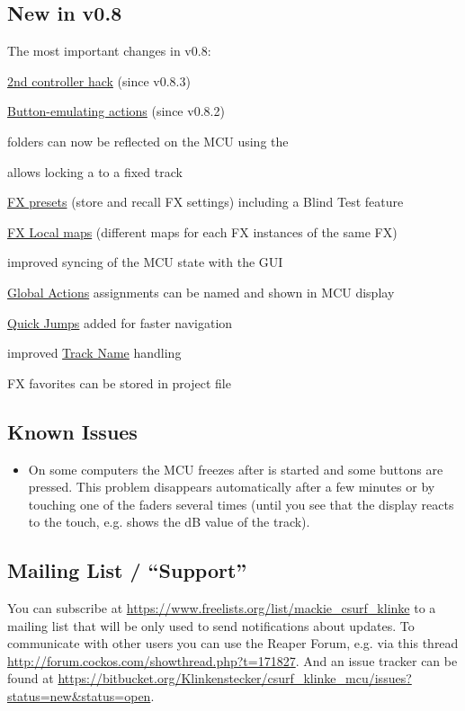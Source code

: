 \subsection{New in v0.8}

The most important changes in v0.8:
\begin{compactitem}
\item \hyperref[secondcontroller]{2nd controller hack} (since v0.8.3)
\item \hyperref[buttonactions]{Button-emulating actions} (since v0.8.2)
\item \reaper folders can now be reflected on the MCU using the \foldermode
\item \anchors allows locking a \cs to a fixed track
\item \hyperref[fxpresets]{FX presets} (store and recall FX settings) including
a Blind Test feature
\item \hyperref[localmaps]{FX Local maps} (different maps for each FX
instances of the same FX)
\item improved syncing of the MCU state with the \reaper GUI
\item \hyperref[globalactions]{Global Actions} assignments can be named and
shown in MCU display
\item \hyperref[quickjump]{Quick Jumps} added for faster navigation  
\item improved \hyperref[tracknames]{Track Name} handling
\item FX favorites can be stored in \reaper project file
\end{compactitem}

\subsection{Known Issues}
\begin{itemize}
\item On some computers the MCU freezes after  \reaper is started and
  some buttons are pressed. This problem disappears automatically after
  a few minutes or by touching one of the faders several times (until you
  see that the display reacts to the touch, e.g. shows the dB
  value of the track).
\end{itemize}

\subsection{Mailing List / ``Support''}
You can subscribe at \url{https://www.freelists.org/list/mackie_csurf_klinke}
to a mailing list that will be only used to send notifications about
updates.
To communicate with other users you can use the Reaper Forum,
e.g. via this thread
\url{http://forum.cockos.com/showthread.php?t=171827}.
And an issue tracker can be found at \url{https://bitbucket.org/Klinkenstecker/csurf_klinke_mcu/issues?status=new&status=open}.

